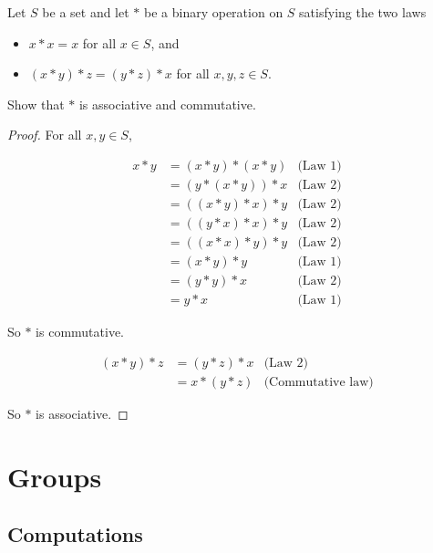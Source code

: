 \begin{exercise}
    Let $S$ be a set and let $*$ be a binary operation on $S$ satisfying the two laws
    \begin{itemize}
        \item $x * x = x$ for all $x\in S$, and
        \item $(x * y) * z = (y * z) * x$ for all $x, y, z\in S$.
    \end{itemize}

    Show that $*$ is associative and commutative.
\end{exercise}

\begin{proof}
    For all $x, y\in S$,

    \begin{align*}
        x * y & = (x * y) * (x * y) & \text{(Law 1)} \\
              & = (y * (x * y)) * x & \text{(Law 2)} \\
              & = ((x * y) * x) * y & \text{(Law 2)} \\
              & = ((y * x) * x) * y & \text{(Law 2)} \\
              & = ((x * x) * y) * y & \text{(Law 2)} \\
              & = (x * y) * y       & \text{(Law 1)} \\
              & = (y * y) * x       & \text{(Law 2)} \\
              & = y * x             & \text{(Law 1)}
    \end{align*}

    So $*$ is commutative.

    \begin{align*}
        (x * y) * z & = (y * z) * x & \text{(Law 2)}           \\
                    & = x * (y * z) & \text{(Commutative law)}
    \end{align*}

    So $*$ is associative.
\end{proof}


\section{Groups}

\subsection*{Computations}

